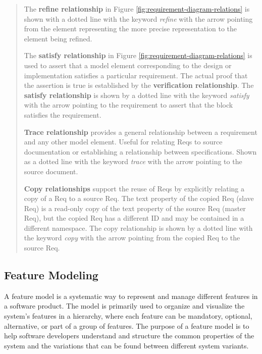 \begin{quote}
The \textbf{refine relationship} in Figure \ref{fig:requirement-diagram-relations} is shown with a dotted line with the keyword \textit{refine} with the arrow pointing from the element representing the more precise representation to the element being refined.

The \textbf{satisfy relationship} in Figure \ref{fig:requirement-diagram-relations} is used to assert that a model element corresponding to the design or implementation satisfies a particular requirement. The actual proof that the assertion is true is established by the \textbf{verification relationship}. The \textbf{satisfy relationship} is shown by a dotted line with the keyword \textit{satisfy} with the arrow pointing to the requirement to assert that the block satisfies the requirement.

\textbf{Trace relationship} provides a general relationship between a requirement and any other model element. Useful for relating Reqs to source documentation or establishing a relationship between specifications. Shown as a dotted line with the keyword \textit{trace} with the arrow pointing to the source document.

\textbf{Copy relationships} support the reuse of Reqs by explicitly relating a copy of a Req to a source Req. The text property of the copied Req (slave Req) is a read-only copy of the text property of the source Req (master Req), but the copied Req has a different ID and may be contained in a different namespace. The copy relationship is shown by a dotted line with the keyword \textit{copy} with the arrow pointing from the copied Req to the source Req.
\end{quote}
\subsection{Feature Modeling} %

A feature model is a systematic way to represent and manage different features in a software product. %
The model is primarily used to organize and visualize the system's features in a hierarchy, where each feature can be mandatory, optional, alternative, or part of a group of features. The purpose of a feature model is to help software developers understand and structure the common properties of the system and the variations that can be found between different system variants\cite{featuremodels2023}.

